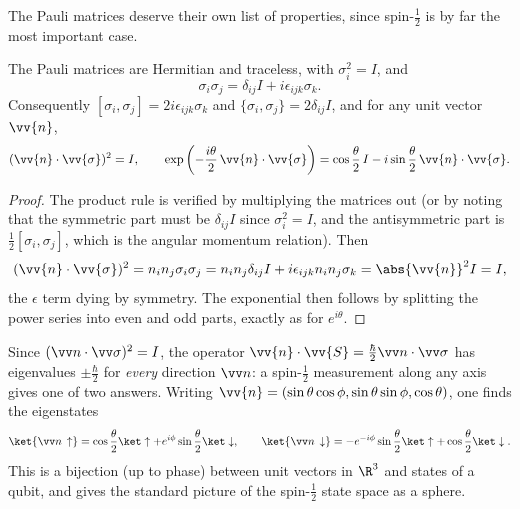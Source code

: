 The Pauli matrices deserve their own list of properties, since spin-$\frac12$ is by far the most important case.

\begin{proposition}
    The Pauli matrices are Hermitian and traceless, with $\sigma_i^2 = I$, and
    $$
    \sigma_i \sigma_j = \delta_{ij} I + i \epsilon_{ijk}\sigma_k.
    $$
    Consequently $[\sigma_i,\sigma_j] = 2i\epsilon_{ijk}\sigma_k$ and $\{\sigma_i,\sigma_j\} = 2\delta_{ij}I$, and for any unit vector $\vv{n}$,
    $$
    (\vv{n}\cdot\vv{\sigma})^2 = I, \qquad \exp\left( -\frac{i\theta}{2}\,\vv{n}\cdot\vv{\sigma} \right) = \cos\frac{\theta}{2}\, I - i \sin\frac{\theta}{2}\, \vv{n}\cdot\vv{\sigma}.
    $$
\end{proposition}
\begin{proof}
    The product rule is verified by multiplying the matrices out (or by noting that the symmetric part must be $\delta_{ij}I$ since $\sigma_i^2 = I$, and the antisymmetric part is $\frac12[\sigma_i,\sigma_j]$, which is the angular momentum relation). Then
    $$
    (\vv{n}\cdot\vv{\sigma})^2 = n_in_j\sigma_i\sigma_j = n_in_j\delta_{ij}I + i\epsilon_{ijk}n_in_j\sigma_k = \abs{\vv{n}}^2 I = I,
    $$
    the $\epsilon$ term dying by symmetry. The exponential then follows by splitting the power series into even and odd parts, exactly as for $e^{i\theta}$.
\end{proof}

Since $(\vv n \cdot \vv \sigma)^2 = I$, the operator $\vv{n}\cdot\vv{S} = \frac{\hbar}{2}\vv n \cdot \vv\sigma$ has eigenvalues $\pm\frac\hbar2$ for \emph{every} direction $\vv n$: a spin-$\frac12$ measurement along any axis gives one of two answers. Writing $\vv{n} = (\sin\theta\cos\phi, \sin\theta\sin\phi,\cos\theta)$, one finds the eigenstates
$$
\ket{\vv n \,\uparrow} = \cos\frac\theta2 \ket\uparrow + e^{i\phi}\sin\frac\theta2\ket\downarrow, \qquad
\ket{\vv n \,\downarrow} = -e^{-i\phi}\sin\frac\theta2 \ket\uparrow + \cos\frac\theta2\ket\downarrow.
$$
This is a bijection (up to phase) between unit vectors in $\R^3$ and states of a qubit, and gives the standard picture of the spin-$\frac12$ state space as a sphere.

